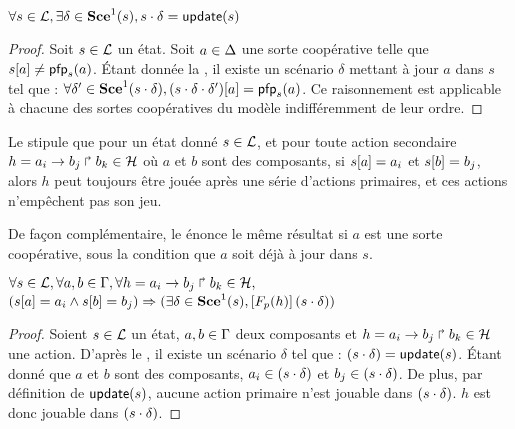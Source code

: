 \begin{lemma}
  $\forall s \in \mathcal{L}, \exists \delta \in \mathbf{Sce}^1(s), s \cdot \delta = \mathsf{update}(s)$
\end{lemma}

\begin{proof} %
  Soit $s \in \mathcal{L}$ un état.
  Soit $a \in \Delta$ une sorte coopérative telle que ${s[a]} \neq \mathsf{pfp}_s(a)$.
  Étant donnée la , il existe un scénario $\delta$ mettant à jour $a$
  dans $s$ tel que :
  $\forall \delta' \in \mathbf{Sce}^1(s \cdot \delta),
    {(s \cdot \delta \cdot \delta')[a]} = \mathsf{pfp}_s(a)$.
  Ce raisonnement est applicable à chacune des sortes coopératives du modèle
  indifféremment de leur ordre.
\end{proof}

Le  stipule que pour un état donné $s \in \mathcal{L}$, et pour toute action secondaire
$h = a_i\rightarrow b_j\Rsh b_k \in \mathcal{H}$ où $a$ et $b$ sont des composants,
si ${s[a]} = a_i$ et ${s[b]} = b_j$, alors
$h$ peut toujours être jouée après une série d'actions primaires,
et ces actions n'empêchent pas son jeu.

De façon complémentaire, le  énonce le même résultat si $a$ est une sorte coopérative,
sous la condition que $a$ soit déjà à jour dans $s$.

\begin{lemma}
  $\forall s \in \mathcal{L}, \forall a,b \in \Gamma, \forall h = a_i\rightarrow b_j\Rsh b_k \in \mathcal{H},$\\
  $({s[a]} = a_i \wedge {s[b]} = b_j) \Rightarrow
    (\exists \delta \in \mathbf{Sce}^1(s),
    \left[F_{p}(h)\right](s \cdot \delta))$
\end{lemma}

\begin{proof} %
  Soient $s \in \mathcal{L}$ un état, $a,b \in \Gamma$ deux composants et
  $h = a_i\rightarrow b_j\Rsh b_k \in \mathcal{H}$ une action.
  D'après le , il existe un scénario $\delta$ tel que :
  $(s \cdot \delta) = \mathsf{update}(s)$.
  Étant donné que $a$ et $b$ sont des composants,
  $a_i \in (s \cdot \delta)$ et $b_j \in (s \cdot \delta)$.
  De plus, par définition de $\mathsf{update}(s)$, aucune action primaire n'est jouable
  dans $(s \cdot \delta)$.
  $h$ est donc jouable dans $(s \cdot \delta)$.
\end{proof}

